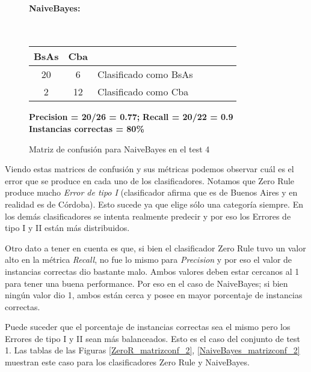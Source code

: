 \begin{figure}[H]
	\centering
	\paragraph*{NaiveBayes:}\mbox{}\\
	\begin{table}[H]
		\centering
		\begin{tabular}{|c|c|l|c|c|c|c|}
			\hline
			BsAs & Cba &  \\ \hline
			20 &  6 &  Clasificado como BsAs \\ \hline
			2  &  12 &  Clasificado como Cba \\ \hline
		\end{tabular}
	\end{table}
	\begin{center}
		\textbf{Precision = 20/26 = 0.77;} \textbf{Recall = 20/22 = 0.9}\\
		\textbf{Instancias correctas = 80\%}
	\end{center}
	\caption{Matriz de confusión para NaiveBayes en el test 4}
	\label{NaiveBayes_matrizconf}
\end{figure}

Viendo estas matrices de confusión y sus métricas podemos observar cuál es el error que se produce en cada uno de los clasificadores. Notamos que Zero Rule produce mucho \textit{Error de tipo I} (clasificador afirma que es de Buenos Aires y en realidad es de Córdoba). Esto sucede ya que elige sólo una categoría siempre. En los demás clasificadores se intenta realmente predecir y por eso los Errores de tipo I y II están más distribuidos.

Otro dato a tener en cuenta es que, si bien el clasificador Zero Rule tuvo un valor alto en la métrica \textit{Recall}, no fue lo mismo para \textit{Precision} y por eso el valor de instancias correctas dio bastante malo. Ambos valores deben estar cercanos al 1 para tener una buena performance. Por eso en el caso de NaiveBayes; si bien ningún valor dio 1, ambos están cerca y posee en mayor porcentaje de instancias correctas.

Puede suceder que el porcentaje de instancias correctas sea el mismo pero los Errores de tipo I y II sean más balanceados. Esto es el caso del conjunto de test 1. Las tablas de las Figuras \ref{ZeroR_matrizconf_2}, \ref{NaiveBayes_matrizconf_2} muestran este caso para los clasificadores Zero Rule y NaiveBayes.


